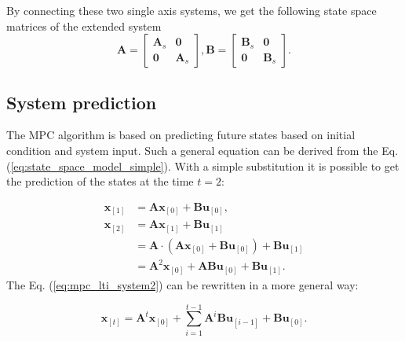 \documentclass[a4paper,11pt,titlepage]{article}
\begin{document}
By connecting these two single axis systems, we get the following state space matrices of the extended system
\begin{equation}
\label{eq:state_space}
\textbf{A} = \begin{bmatrix}
	\textbf{A}_s & \textbf{0}	\\
	\textbf{0}   & \textbf{A}_s
\end{bmatrix}, \textbf{B} = \begin{bmatrix}
	\textbf{B}_s & \textbf{0}	\\
	\textbf{0}   & \textbf{B}_s
\end{bmatrix}.
\end{equation}









\subsection{System prediction}
The MPC algorithm is based on predicting future states based on initial condition and system input. Such a general equation can be derived from the Eq. (\ref{eq:state_space_model_simple}). With a simple substitution it is possible to get the prediction of the states at the time $t = 2$:

\begin{equation}
\begin{split}
\label{eq:mpc_lti_system2}
\textbf{x}_{[1]} &= \textbf{A}\textbf{x}_{[0]} + \textbf{B}\textbf{u}_{[0]},\\
\textbf{x}_{[2]} &= \textbf{A}\textbf{x}_{[1]} + \textbf{B}\textbf{u}_{[1]}\\
&= \textbf{A}\cdot(\textbf{A}\textbf{x}_{[0]} + \textbf{B}\textbf{u}_{[0]}) + \textbf{B}\textbf{u}_{[1]} \\
&=\textbf{A}^2\textbf{x}_{[0]} + \textbf{A}\textbf{B}\textbf{u}_{[0]} + \textbf{B} \textbf{u}_{[1]}.
\end{split}
\end{equation}
The Eq. (\ref{eq:mpc_lti_system2}) can be rewritten in a more general way:

\begin{equation}
\label{eq:mpc_lti_system_general}
\textbf{x}_{[t]} =\textbf{A}^t\textbf{x}_{[0]} + 
\sum_{i = 1}^{t-1}\textbf{A}^{i}\textbf{B}\textbf{u}_{[i-1]} + \textbf{B} \textbf{u}_{[0]}.
\end{equation}
\end{document}
